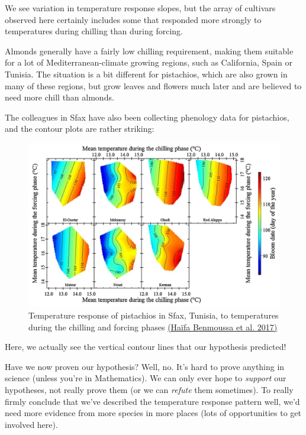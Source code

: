 \documentclass[
]{book}
\begin{document}
We see variation in temperature response slopes, but the array of cultivars observed here certainly includes some that responded more strongly to temperatures during chilling than during forcing.

Almonds generally have a fairly low chilling requirement, making them suitable for a lot of Mediterranean-climate growing regions, such as California, Spain or Tunisia. The situation is a bit different for pistachios, which are also grown in many of these regions, but grow leaves and flowers much later and are believed to need more chill than almonds.

The colleagues in Sfax have also been collecting phenology data for pistachios, and the contour plots are rather striking:

\begin{figure}
\centering
\includegraphics{pictures/rainbow_pistachios.jpg}
\caption{Temperature response of pistachios in Sfax, Tunisia, to temperatures during the chilling and forcing phases \href{https://doi.org/10.1016/j.envexpbot.2017.05.007}{(Haïfa Benmoussa et al. \protect\hyperlink{ref-benmoussa_performance_2017}{2017})}}
\end{figure}

Here, we actually see the vertical contour lines that our hypothesis predicted!

Have we now proven our hypothesis? Well, no. It's hard to prove anything in science (unless you're in Mathematics). We can only ever hope to \emph{support} our hypotheses, not really prove them (or we can \emph{refute} them sometimes). To really firmly conclude that we've described the temperature response pattern well, we'd need more evidence from more species in more places (lots of opportunities to get involved here).
\end{document}
